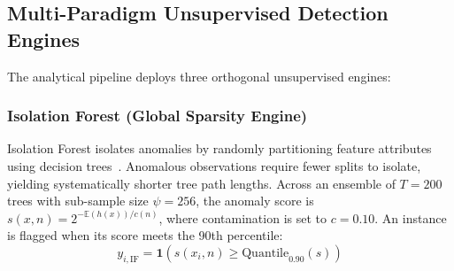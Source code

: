 \documentclass[conference]{IEEEtran}
\begin{document}
\begin{table}[htbp]
\centering
\caption{Engineered Feature Constructs and Targeted Anomaly Typologies}
\label{tab:feature_matrix}
\setlength{\tabcolsep}{2.5pt}
\end{table}

\subsection{Multi-Paradigm Unsupervised Detection Engines}

The analytical pipeline deploys three orthogonal unsupervised engines:

\subsubsection{Isolation Forest (Global Sparsity Engine)}
Isolation Forest isolates anomalies by randomly partitioning feature attributes using decision trees~\cite{ref18}. Anomalous observations require fewer splits to isolate, yielding systematically shorter tree path lengths. Across an ensemble of $T = 200$ trees with sub-sample size $\psi = 256$, the anomaly score is $s(x, n) = 2^{-\mathbb{E}(h(x))/c(n)}$, where contamination is set to $c = 0.10$. An instance is flagged when its score meets the 90th percentile:
\begin{equation}
y_{i, \mathrm{IF}} = \mathbf{1}\left(s(x_i, n) \ge \mathrm{Quantile}_{0.90}(s)\right)
\end{equation}
\end{document}
